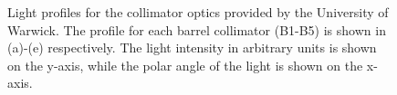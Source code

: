 \begin{figure}[!htbp]
    \centering
    
    
    
    \hfill
    \par
    \hfill
    \par

    \caption{Light profiles for the collimator optics provided by the University of Warwick. The profile for each barrel collimator (B1-B5) is shown in (a)-(e) respectively. The light intensity in arbitrary units is shown on the y-axis, while the polar angle of the light is shown on the x-axis.}\label{fig:collimator_TF1}
\end{figure}



